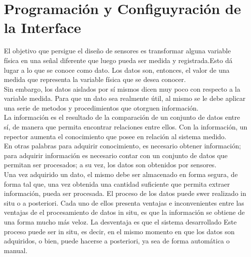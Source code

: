 \section{Programación y Configuyración de la Interface}

	El objetivo que persigue el diseño de sensores es transformar alguna variable física en una señal diferente que luego pueda ser medida y registrada.Esto dá lugar a lo que se conoce
como dato. Los datos son, entonces, el valor de una medida que representa la variable física que se desea conocer.\\
	Sin embargo, los datos aislados por sí mismos dicen muy poco con respecto a la variable medida. Para que un dato sea realmente útil, al mismo se le debe aplicar una serie de metodos
y procedimientos que otorguen información.\\
	La información es el resultado de la comparación de un conjunto de datos entre sí, de manera que permita encontrar relaciones entre ellos. Con la información, un repector aumenta el
conocimiento que posee en relación al sistema medido.\\
	En otras palabras para adquirir conocimiento, es necesario obtener información; para adquirir información es necesario contar con un conjunto de datos que permitan ser procesados;
a su vez, los datos son obtenidos por sensores.\\
	Una vez adquirido un dato, el mismo debe ser almacenado en forma segura, de forma tal que, una vez obtenida una cantidad suficiente que permita extraer información, pueda ser procesada.
	El proceso de los datos puede swer realizado in situ o a posteriori.
	Cada uno de ellos presenta ventajas e inconvenientes
	entre las ventajas de el procesamiento de datos in situ, es que la información se obtiene de una forma mucho más veloz. La desventaja es que el sistema desarrollado 
Este proceso puede ser in situ, es decir, en el mismo
momento en que los datos son adquiridos, o bien, puede hacerse a posteriori, ya sea de forma automática o manual. 

